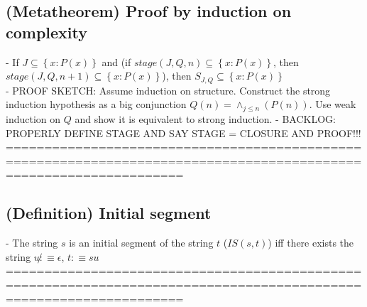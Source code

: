 \documentclass{book}
\newcommand{\is}{:\equiv}
\newcommand{\inot}{\not}
\newcommand{\set}[1]{\left\{ #1 \right\}}
\begin{document}
\subsection{(Metatheorem) Proof by induction on complexity} %
	- If $J \subseteq \set{x: P(x)}$ and (if $stage(J, Q, n) \subseteq \set{x: P(x)}$, then $stage(J, Q, n+1) \subseteq \set{x: P(x)}$), then $S_{J, Q} \subseteq \set{x: P(x)}$ \\
	- PROOF SKETCH: Assume induction on structure. Construct the strong induction hypothesis as a big conjunction $Q(n) = \land_{j \leq n}(P(n))$. Use weak induction on $Q$ and show it is equivalent to strong induction.
	- BACKLOG: PROPERLY DEFINE STAGE AND SAY STAGE = CLOSURE AND PROOF!!! \\
	===================================================================================================================
\subsection{(Definition) Initial segment} %
	- The string $s$ is an initial segment of the string $t$ ($IS(s, t)$) iff there exists the string $u \inot \is \epsilon$, $t \is s u$ \\
	===================================================================================================================
\end{document}
